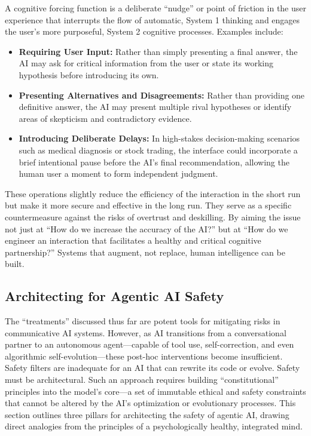 \documentclass{article}
\begin{document}
A cognitive forcing function is a deliberate “nudge” or point of friction in the user experience that interrupts the flow of automatic, System 1 thinking and engages the user's more purposeful, System 2 cognitive processes. Examples include:
\begin{itemize}
    \item \textbf{Requiring User Input:} Rather than simply presenting a final answer, the AI may ask for critical information from the user or state its working hypothesis before introducing its own.
    \item \textbf{Presenting Alternatives and Disagreements:} Rather than providing one definitive answer, the AI may present multiple rival hypotheses or identify areas of skepticism and contradictory evidence.
    \item \textbf{Introducing Deliberate Delays:} In high-stakes decision-making scenarios such as medical diagnosis or stock trading, the interface could incorporate a brief intentional pause before the AI's final recommendation, allowing the human user a moment to form independent judgment.
\end{itemize}
These operations slightly reduce the efficiency of the interaction in the short run but make it more secure and effective in the long run. They serve as a specific countermeasure against the risks of overtrust and deskilling. By aiming the issue not just at “How do we increase the accuracy of the AI?” but at “How do we engineer an interaction that facilitates a healthy and critical cognitive partnership?” Systems that augment, not replace, human intelligence can be built.

\subsection{Architecting for Agentic AI Safety}
The “treatments” discussed thus far are potent tools for mitigating risks in communicative AI systems. However, as AI transitions from a conversational partner to an autonomous agent—capable of tool use, self-correction, and even algorithmic self-evolution—these post-hoc interventions become insufficient. Safety filters are inadequate for an AI that can rewrite its code or evolve. Safety must be architectural. Such an approach requires building “constitutional” principles into the model's core—a set of immutable ethical and safety constraints that cannot be altered by the AI's optimization or evolutionary processes. This section outlines three pillars for architecting the safety of agentic AI, drawing direct analogies from the principles of a psychologically healthy, integrated mind.
\end{document}
